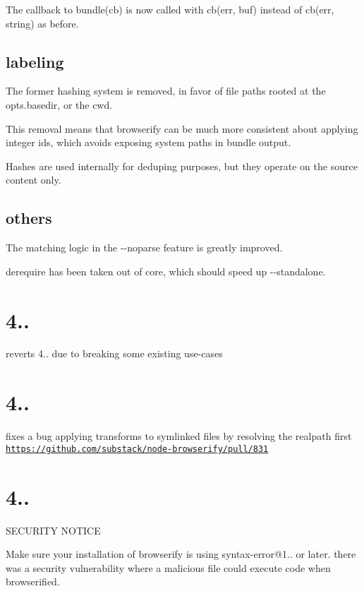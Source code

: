 The callback to {\ttfamily bundle(cb)} is now called with {\ttfamily cb(err, buf)} instead of {\ttfamily cb(err, string)} as before.

\subsection*{labeling}

The former hashing system is removed, in favor of file paths rooted at the {\ttfamily opts.\+basedir}, or the cwd.

This removal means that browserify can be much more consistent about applying integer ids, which avoids exposing system paths in bundle output.

Hashes are used internally for deduping purposes, but they operate on the source content only.

\subsection*{others}

The matching logic in the {\ttfamily -\/-\/noparse} feature is greatly improved.

derequire has been taken out of core, which should speed up {\ttfamily -\/-\/standalone}.

\section*{4..}

reverts 4.. due to breaking some existing use-\/cases

\section*{4..}

fixes a bug applying transforms to symlinked files by resolving the realpath first \href{https://github.com/substack/node-browserify/pull/831}{\tt https\+://github.\+com/substack/node-\/browserify/pull/831}

\section*{4..}

S\+E\+C\+U\+R\+I\+TY N\+O\+T\+I\+CE

Make sure your installation of browserify is using syntax-\/error@1.. or later. there was a security vulnerability where a malicious file could execute code when browserified.

